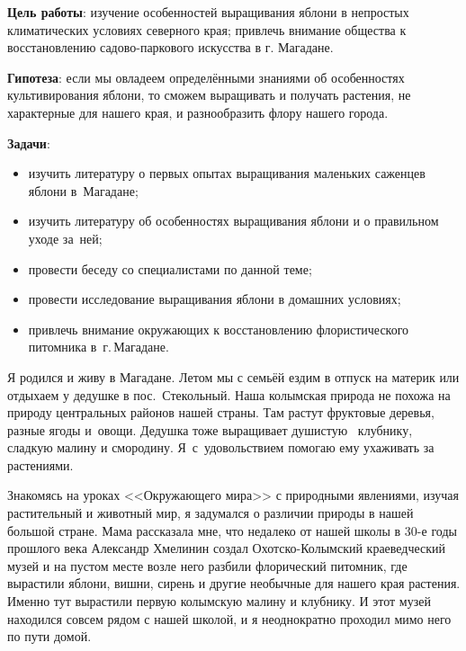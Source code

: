 \bigskip
{}



\makeProcTitleSchool


\textbf{Цель работы}: изучение особенностей выращивания яблони в непростых климатических условиях северного края; привлечь внимание общества к восстановлению садово-паркового искусства в г. Магадане.

\textbf{Гипотеза}: если мы овладеем определёнными знаниями об особенностях культивирования яблони, то сможем выращивать и получать растения, не характерные для нашего края, и разнообразить флору нашего города.

\textbf{Задачи}:

\begin{itemize}[noitemsep]\vspace{-8pt}
\item изучить литературу о первых опытах выращивания маленьких саженцев яблони в~Магадане;
\item изучить литературу об особенностях выращивания яблони и о правильном уходе за~ней;
\item провести беседу со специалистами по данной теме;
\item провести исследование  выращивания яблони в домашних условиях;
\item привлечь внимание окружающих к восстановлению флористического питомника в~г.\,Ма\-га\-да\-не.
\end{itemize}\vspace{-8pt}

Я родился и живу в Магадане. Летом мы с семьёй ездим в отпуск на материк или отдыхаем у дедушке в пос.~Стекольный. Наша колымская природа не похожа на природу центральных районов нашей страны. Там растут фруктовые деревья, разные ягоды и~овощи. Дедушка тоже выращивает душистую  клубнику, сладкую малину и смородину. Я~с~удовольствием помогаю ему ухаживать за растениями.

Знакомясь на уроках <<Окружающего мира>> с природными явлениями, изучая растительный и животный мир, я задумался о различии природы в нашей большой стране. Мама рассказала мне, что недалеко от нашей школы в 30-е годы прошлого века Александр Хмелинин создал Охотско-Колымский краеведческий музей и на пустом месте возле него разбили флорический питомник, где вырастили яблони, вишни, сирень и другие необычные для нашего края растения. Именно тут вырастили первую колымскую малину и клубнику. И этот музей находился совсем рядом с нашей школой, и я неоднократно проходил мимо него по пути домой.

